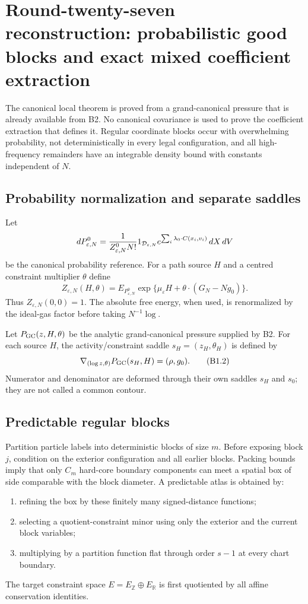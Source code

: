 
\section{Round-twenty-seven reconstruction: probabilistic good blocks and exact mixed coefficient extraction}
\label{sec:r27-b1}

The canonical local theorem is proved from a grand-canonical pressure that is
already available from B2.  No canonical covariance is used to prove the
coefficient extraction that defines it.  Regular coordinate blocks occur with
overwhelming probability, not deterministically in every legal
configuration, and all high-frequency remainders have an integrable density
bound with constants independent of $N$.

\subsection{Probability normalization and separate saddles}

Let
\[
 dP_{\varepsilon,N}^{0}
 ={1\over Z_{\varepsilon,N}^{0}N!}
 1_{\mathcal D_{\varepsilon,N}}
 e^{\sum_i\lambda_0\cdot C(x_i,v_i)}\,dX\,dV
\]
be the canonical probability reference.  For a path source $H$ and a centred
constraint multiplier $\theta$ define
\[
 Z_{\varepsilon,N}(H,\theta)
 =E_{P_{\varepsilon,N}^{0}}
 \exp\{\mu_\varepsilon H+\theta\cdot(G_N-Ng_0)\}.          \tag{B1.1}
\]
Thus $Z_{\varepsilon,N}(0,0)=1$.  The absolute free energy, when used, is
renormalized by the ideal-gas factor before taking $N^{-1}\log$.

Let $P_{\rm GC}(z,H,\theta)$ be the analytic grand-canonical pressure supplied
by B2.  For each source $H$, the activity/constraint saddle
$s_H=(z_H,\theta_H)$ is defined by
\[
 \nabla_{(\log z,\theta)}P_{\rm GC}(s_H,H)=(\rho,g_0).     \tag{B1.2}
\]
Numerator and denominator are deformed through their own saddles $s_H$ and
$s_0$; they are not called a common contour.

\subsection{Predictable regular blocks}

Partition particle labels into deterministic blocks of size $m$.  Before
exposing block $j$, condition on the exterior configuration and all earlier
blocks.  Packing bounds imply that only $C_m$ hard-core boundary components
can meet a spatial box of side comparable with the block diameter.  A
predictable atlas is obtained by:
\begin{enumerate}[label=(\roman*)]
\item refining the box by these finitely many signed-distance functions;
\item selecting a quotient-constraint minor using only the exterior and the
      current block variables;
\item multiplying by a partition function flat through order $s-1$ at every
      chart boundary.
\end{enumerate}
The target constraint space $E=E_{\mathbb Z}\oplus E_{\mathbb R}$ is first
quotiented by all affine conservation identities.

